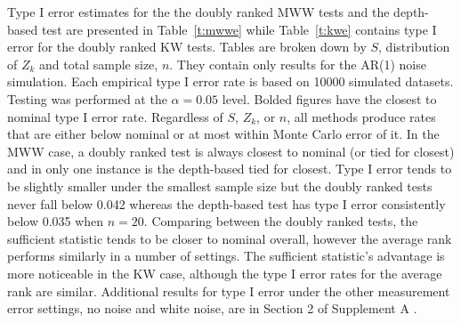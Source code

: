 \documentclass[12pt]{article}
\theoremstyle{plain}
\theoremstyle{remark}
\begin{document}


	Type I error estimates for the the doubly ranked MWW tests and the depth-based test are presented in Table~\ref{t:mwwe} while Table~\ref{t:kwe} contains type I error for the doubly ranked KW tests. Tables are broken down by $S$, distribution of $Z_k$ and total sample size, $n$. They contain only results for the AR(1) noise simulation. Each empirical type I error rate is based on 10000 simulated datasets. Testing was performed at the $\alpha = 0.05$ level. Bolded figures have the closest to nominal type I error rate. Regardless of $S$, $Z_k$, or $n$, all methods produce rates that are either below nominal or at most within Monte Carlo error of it. In the MWW case, a doubly ranked test is always closest to nominal (or tied for closest) and in only one instance is the depth-based tied for closest. Type I error tends to be slightly smaller under the smallest sample size but the doubly ranked tests never fall below 0.042 whereas the depth-based test has type I error consistently below 0.035 when $n = 20$. Comparing between the doubly ranked tests, the sufficient statistic tends to be closer to nominal overall, however the average rank performs similarly in a number of settings. The sufficient statistic's advantage is more noticeable in the KW case, although the type I error rates for the average rank are similar. Additional results for type I error under the other measurement error settings, no noise and white noise, are in Section 2 of Supplement A \citep{DRTSup2024A}.

\end{document}
